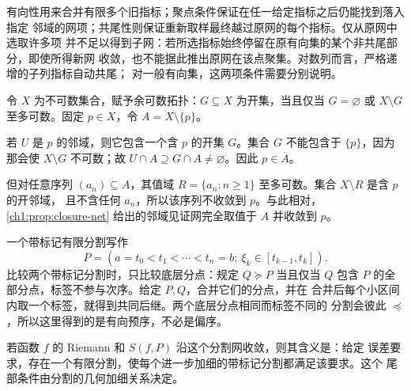 \begin{remark}
有向性用来合并有限多个旧指标；聚点条件保证在任一给定指标之后仍能找到落入指定
邻域的网项；共尾性则保证重新取样最终越过原网的每个指标。仅从原网中选取许多项
并不足以得到子网：若所选指标始终停留在原有向集的某个非共尾部分，即使所得新网
收敛，也不能据此推出原网在该点聚集。对数列而言，严格递增的子列指标自动共尾；
对一般有向集，这两项条件需要分别说明。
\end{remark}

\begin{counterexample}[序列看不见的闭包]
令 \(X\) 为不可数集合，赋予余可数拓扑：\(G\subseteq X\) 为开集，当且仅当
\(G=\varnothing\) 或 \(X\setminus G\) 至多可数。固定 \(p\in X\)，令
\(A=X\setminus\{p\}\)。

若 \(U\) 是 \(p\) 的邻域，则它包含一个含 \(p\) 的开集 \(G\)。集合 \(G\)
不能包含于 \(\{p\}\)，因为那会使 \(X\setminus G\) 不可数；故
\(U\cap A\supseteq G\cap A\neq\varnothing\)。因此 \(p\in\overline A\)。

但对任意序列 \((a_n)\subseteq A\)，其值域
\(R=\{a_n:n\geq1\}\) 至多可数。集合 \(X\setminus R\) 是含 \(p\) 的开邻域，
且不含任何 \(a_n\)，所以该序列不收敛到 \(p\)。与此相对，
\cref{ch1:prop:closure-net} 给出的邻域见证网完全取值于 \(A\) 并收敛到 \(p\)。
\end{counterexample}

\begin{example}[带标记分割的加细网]
一个带标记有限分割写作
\[
 P=(a=t_0<t_1<\cdots<t_n=b;\ \xi_k\in[t_{k-1},t_k]).
\]
比较两个带标记分割时，只比较底层分点：规定 \(Q\succeq P\) 当且仅当 \(Q\)
包含 \(P\) 的全部分点，标签不参与次序。给定 \(P,Q\)，合并它们的分点，并在
合并后每个小区间内取一个标签，就得到共同后继。两个底层分点相同而标签不同的
分割会彼此 \(\preceq\)，所以这里得到的是有向预序，不必是偏序。

若函数 \(f\) 的 Riemann 和 \(S(f,P)\) 沿这个分割网收敛，则其含义是：给定
误差要求，存在一个有限分割，使每个进一步加细的带标记分割都满足该要求。这个
尾部条件由分割的几何加细关系决定。
\end{example}

